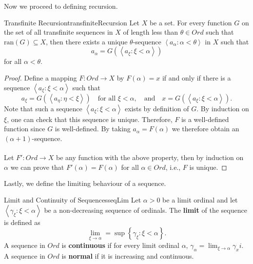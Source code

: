 \documentclass[math]{amznotes}
\theoremstyle{remark}
\begin{document}
Now we proceed to defining recursion.
\begin{thmbox}{Transfinite Recursion}{transfiniteRecursion}
    Let $X$ be a set. For every function $G$ on the set of all transfinite sequences in $X$ of length less than $\theta \in Ord$ such that $\mathrm{ran}(G) \subseteq X$, then there exists a unique $\theta$-sequence $\left\langle a_\alpha \colon \alpha < \theta \right\rangle$ in $X$ such that
    \begin{equation*}
        a_\alpha = G\left(\left\langle a_\xi \colon \xi < \alpha \right\rangle\right)
    \end{equation*}
    for all $\alpha < \theta$.
    \tcblower
    \begin{proof}
        Define a mapping $F \colon Ord \to X$ by $F(\alpha) = x$ if and only if there is a sequence $\left\langle a_\xi \colon \xi < \alpha \right\rangle$ such that 
        \begin{equation*}
            a_\xi = G\left(\left\langle a_\eta \colon \eta < \xi \right\rangle\right) \quad \textrm{for all } \xi < \alpha, \quad \textrm{and} \quad x = G\left(\left\langle a_\xi \colon \xi < \alpha \right\rangle\right).
        \end{equation*}
        Note that such a sequence $\left\langle a_\xi \colon \xi < \alpha \right\rangle$ exists by definition of $G$. By induction on $\xi$, one can check that this sequence is unique. Therefore, $F$ is a well-defined function since $G$ is well-defined. By taking $a_\alpha = F(\alpha)$ we therefore obtain an $(\alpha + 1)$-sequence.
        \\\\
        Let $F' \colon Ord \to X$ be any function with the above property, then by induction on $\alpha$ we can prove that $F'(\alpha) = F(\alpha)$ for all $\alpha \in Ord$, i.e., $F$ is unique.
    \end{proof}
\end{thmbox}
Lastly, we define the limiting behaviour of a sequence.
\begin{dfnbox}{Limit and Continuity of Sequences}{seqLim}
    Let $\alpha > 0$ be a limit ordinal and let $\left\langle \gamma_\xi \colon \xi < \alpha \right\rangle$ be a non-decreasing sequence of ordinals. The {\color{red} \textbf{limit}} of the sequence is defined as
    \begin{equation*}
        \lim_{\xi \to \alpha} = \sup\left\{\gamma_\xi \colon \xi < \alpha\right\}.
    \end{equation*}
    A sequence in $Ord$ is {\color{red} \textbf{continuous}} if for every limit ordinal $\alpha$, $\gamma_\alpha = \lim_{\xi \to \alpha}\gamma_xi$. A sequence in $Ord$ is {\color{red} \textbf{normal}} if it is increasing and continuous.   
\end{dfnbox}
\end{document}
